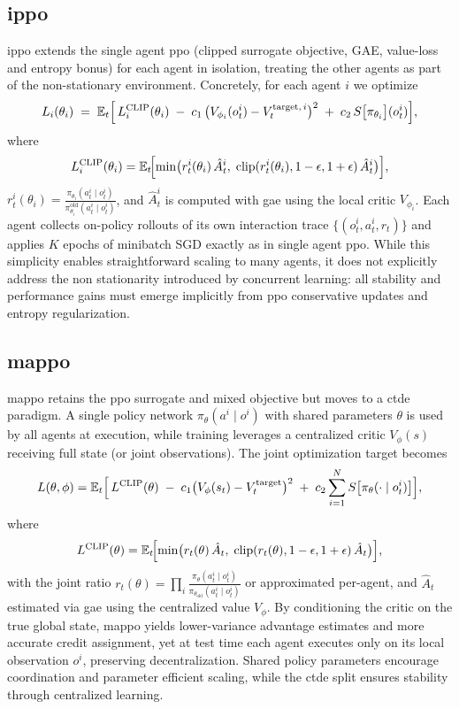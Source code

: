 \subsection{\gls{ippo}}
\gls{ippo} \cite{witt_is_2020} extends the single agent \gls{ppo} (clipped surrogate objective, GAE, value-loss and entropy bonus) for each agent in isolation, treating the other agents as part of the non-stationary environment.  Concretely, for each agent \(i\) we optimize
\[
  L_i(\theta_i) \;=\; 
  \mathbb{E}_t \Bigl[\,L^{\mathrm{CLIP}}_i(\theta_i) \;-\; c_1\,\bigl(V_{\phi_i}(o^i_t)-V^{\text{target},\,i}_t\bigr)^2
    \;+\; c_2\,S\bigl[\pi_{\theta_i}\bigr](o^i_t)\Bigr],
\]
where
\[
  L^{\mathrm{CLIP}}_i(\theta_i)
  = \mathbb{E}_t\!\Bigl[\min\bigl(r^i_t(\theta_i)\,\hat A^i_t,\;\mathrm{clip}(r^i_t(\theta_i),1-\epsilon,1+\epsilon)\,\hat A^i_t\bigr)\Bigr],
\]
\(r^i_t(\theta_i)\!=\!\frac{\pi_{\theta_i}(a^i_t\mid o^i_t)}{\pi_{\theta_i}^{\mathrm{old}}(a^i_t\mid o^i_t)}\), and \(\hat A^i_t\) is computed with \gls{gae} using the local critic \(V_{\phi_i}\).  Each agent collects on-policy rollouts of its own interaction trace \(\{(o^i_t,a^i_t,r_t)\}\) and applies \(K\) epochs of minibatch SGD exactly as in single agent \gls{ppo}.  While this simplicity enables straightforward scaling to many agents, it does not explicitly address the non stationarity introduced by concurrent learning: all stability and performance gains must emerge implicitly from \gls{ppo} conservative updates and entropy regularization.

\subsection{\gls{mappo}}
\gls{mappo} \cite{yu_surprising_2022} retains the \gls{ppo} surrogate and mixed objective but moves to a \gls{ctde} paradigm.  A single policy network \(\pi_\theta(a^i\mid o^i)\) with shared parameters \(\theta\) is used by all agents at execution, while training leverages a centralized critic \(V_\phi(s)\) receiving full state (or joint observations).  The joint optimization target becomes
\[
  L(\theta,\phi) = \mathbb{E}_t\Bigl[\,L^{\mathrm{CLIP}}(\theta)
   \;-\; c_1\bigl(V_\phi(s_t)-V^{\text{target}}_t\bigr)^2
   \;+\; c_2\sum_{i=1}^N S\bigl[\pi_\theta(\cdot\mid o^i_t)\bigr]\Bigr],
\]
where
\[
  L^{\mathrm{CLIP}}(\theta)
  = \mathbb{E}_t\!\Bigl[\min\bigl(r_t(\theta)\,\hat A_t,\;\mathrm{clip}(r_t(\theta),1-\epsilon,1+\epsilon)\,\hat A_t\bigr)\Bigr],
\]
with the joint ratio \(r_t(\theta)=\prod_i \frac{\pi_\theta(a^i_t\mid o^i_t)}{\pi_{\theta_{\text{old}}}(a^i_t\mid o^i_t)}\) or approximated per-agent, and \(\hat A_t\) estimated via \gls{gae} using the centralized value \(V_\phi\).  By conditioning the critic on the true global state, \gls{mappo} yields lower-variance advantage estimates and more accurate credit assignment, yet at test time each agent executes only on its local observation \(o^i\), preserving decentralization.  Shared policy parameters encourage coordination and parameter efficient scaling, while the \gls{ctde} split ensures stability through centralized learning.


